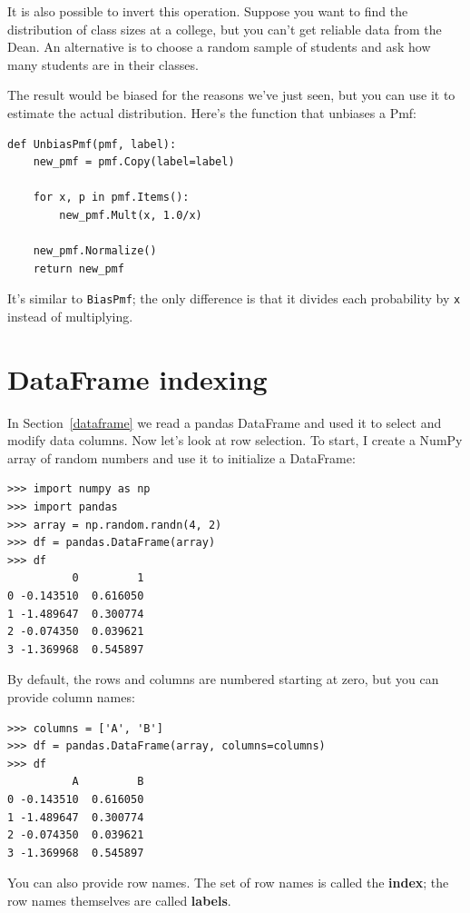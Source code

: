 \documentclass[12pt]{book}
\begin{document}
It is also possible to invert this operation.  Suppose you want to
find the distribution of class sizes at a college, but you can't get
reliable data from the Dean.  An alternative is to choose a random
sample of students and ask how many students are in their
classes.   

The result would be biased for the reasons we've just seen, but you
can use it to estimate the actual distribution.  Here's the function
that unbiases a Pmf:

\begin{verbatim}
def UnbiasPmf(pmf, label):
    new_pmf = pmf.Copy(label=label)

    for x, p in pmf.Items():
        new_pmf.Mult(x, 1.0/x)
        
    new_pmf.Normalize()
    return new_pmf
\end{verbatim}

It's similar to {\tt BiasPmf}; the only difference is that it
divides each probability by {\tt x} instead of multiplying.


\section{DataFrame indexing}

In Section~\ref{dataframe} we read a pandas DataFrame and used it to
select and modify data columns.  Now let's look at row selection.
To start, I create a NumPy array of random numbers and use it
to initialize a DataFrame:

\begin{verbatim}
>>> import numpy as np
>>> import pandas
>>> array = np.random.randn(4, 2)
>>> df = pandas.DataFrame(array)
>>> df
          0         1
0 -0.143510  0.616050
1 -1.489647  0.300774
2 -0.074350  0.039621
3 -1.369968  0.545897
\end{verbatim}

By default, the rows and columns are numbered starting at zero, but
you can provide column names:

\begin{verbatim}
>>> columns = ['A', 'B']
>>> df = pandas.DataFrame(array, columns=columns)
>>> df
          A         B
0 -0.143510  0.616050
1 -1.489647  0.300774
2 -0.074350  0.039621
3 -1.369968  0.545897
\end{verbatim}

You can also provide row names.  The set of row names is called the
{\bf index}; the row names themselves are called {\bf labels}.
\end{document}
